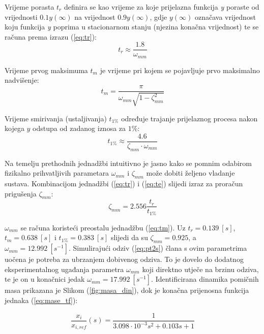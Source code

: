 \documentclass[11pt,a4paper]{article}
\begin{document}
\medskip

Vrijeme porasta $t_{r}$ definira se kao vrijeme za koje prijelazna funkcija \textit{y} poraste od vrijednosti $0.1y(\infty)$ na vrijednost $0.9y(\infty)$, gdje $y(\infty)$ označava vrijednost koju funkcija \textit{y} poprima u stacionarnom stanju (njezina konačna vrijednost) te se računa prema izrazu (\ref{eq:tr}):
\begin{equation}
t_{r} \approx \frac{1.8}{\omega_{mm}}
\label{eq:tr}
\end{equation}


Vrijeme prvog maksimuma $t_{m}$ je vrijeme pri kojem se pojavljuje prvo maksimalno nadvišenje:
\begin{equation}
t_{m} = \frac{\pi}{\omega_{mm}\sqrt{1 - \zeta_{mm}^{2}}}
\label{eq:tm}
\end{equation}

Vrijeme smirivanja (ustaljivanja) $t_{1\%}$ određuje trajanje prijelaznog procesa nakon kojega $y$ odstupa od zadanog iznosa za $1\%$:
\begin{equation}
t_{1\%} \approx \frac{4.6}{\zeta_{mm} \cdot \omega_{mm}}
\label{eq:te}
\end{equation}

Na temelju prethodnih jednadžbi intuitivno je jasno kako se pomnim odabirom fizikalno prihvatljivih parametara $\omega_{mm}$ i $\zeta_{mm}$ može dobiti željeno vladanje sustava. Kombinacijom jednadžbi (\ref{eq:tr}) i (\ref{eq:te}) slijedi izraz za proračun prigušenja $\zeta_{mm}$:
\begin{equation}
\zeta_{mm} = 2.556 \frac{t_{r}}{t_{1\%}}
\label{eq:zeta}
\end{equation}

$\omega_{mm}$ se računa koristeći preostalu jednadžbu (\ref{eq:tm}). Uz $t_{r} = 0.139 \ [s]$, $t_{m} = 0.638 \ [s]$ i $t_{1\%} = 0.383 \ [s]$ slijedi da su $\zeta_{mm} = 0.925$, a $\omega_{mm} = 12.992 \ [s^{-1}]$. Simulirajući odziv (\ref{eq:pt2s}) člana s ovim parametrima uočena je potreba za ubrzanjem dobivenog odziva. To je dovelo do dodatnog eksperimentalnog ugađanja parametra $\omega_{mm}$ koji direktno utječe na brzinu odziva, te je on u konačnici jedak $\omega_{mm} = 17.992 \ [s^{-1}]$. Identificirana dinamika pomičnih masa prikazana je Slikom (\ref{fig:masa_din}), dok je konačna prijenosna funkcija jednaka (\ref{eq:mase_tf}):

\begin{equation}
\boxed{
\frac{x_{i}}{x_{i, ref}}(s) = \frac{1}{3.098\cdot10^{-3}s^{2} + 0.103 s + 1}
}
\label{eq:mase_tf}
\end{equation}
\end{document}
